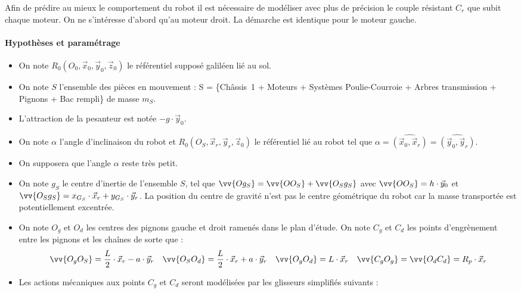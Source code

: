 
\medskip

Afin de prédire au mieux le comportement du robot il est nécessaire de modéliser avec plus de précision le couple résistant $C_r$ que subit chaque moteur. On ne s'intéresse d'abord qu'au moteur droit. La démarche est identique pour le moteur gauche.

\paragraph{Hypothèses et paramétrage}

\begin{itemize}
  \item On note $R_0(O_0,\vec{x}_0,\vec{y}_0,\vec{z}_0)$ le référentiel supposé galiléen lié au sol.
  \item On note $S$ l'ensemble des pièces en mouvement : S = \{Châssis~1 + Moteurs + Systèmes Poulie-Courroie + Arbres transmission + Pignons + Bac rempli\} de masse $m_S$.
  \item L'attraction de la pesanteur est notée $-g\cdot\vec{y}_0$.
  \item On note $\alpha$ l'angle d'inclinaison du robot et $R_0(O_S,\vec{x}_r,\vec{y}_r,\vec{z}_0)$ le référentiel lié au robot tel que
    $\alpha = \widehat{(\vec{x}_0,\vec{x}_r)} = \widehat{(\vec{y}_0,\vec{y}_r)}$.
  \item On supposera que l'angle $\alpha$ reste très petit.
  \item On note $g_S$ le centre d'inertie de l'ensemble $S$, tel que $\vv{Og_S} = \vv{OO_S} + \vv{O_S g_S}$ avec $\vv{OO_S} = h\cdot\vec{y}_0$ et
    $\vv{O_S g_S} = x_{G_S}\cdot\vec{x}_r + y_{G_S}\cdot\vec{y}_r$. La position du centre de gravité n'est pas le centre géométrique du robot car la masse transportée est potentiellement excentrée.
  \item On note $O_g$ et $O_d$ les centres des pignons gauche et droit ramenés dans le plan d'étude. On
    note $C_g$ et $C_d$ les points d'engrènement entre les pignons et les chaînes de sorte que :
    \[
      \vv{O_g O_S} = \frac{L}{2}\cdot\vec{x}_r - a\cdot\vec{y}_r \quad
      \vv{O_S O_d} = \frac{L}{2}\cdot\vec{x}_r + a\cdot\vec{y}_r \quad
      \vv{O_g O_d} = L\cdot\vec{x}_r \quad
      \vv{C_g O_g} = \vv{O_d C_d} = R_p\cdot\vec{x}_r
    \]
  \item Les actions mécaniques aux points $C_g$ et $C_d$ seront modélisées par les glisseurs simplifiés suivants :

\end{itemize}
